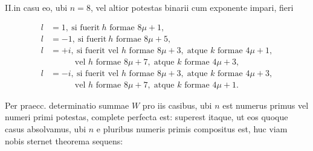 
II.\quad in casu eo, ubi $n=8$, vel altior potestas binarii cum exponente impari, fieri

\[
\begin{aligned}
l&=1,\ \text{si fuerit}\  h\text{ formae }8\mu+1,\\
l&=-1,\ \text{si fuerit}\  h\text{ formae }8\mu+5,\\
l&=+i,\ \text{si fuerit vel }h\text{ formae }8\mu+3,\;\text{atque }k\text{ formae }4\mu+1,\\
&\phantom{=+i,}\text{vel }h\text{ formae }8\mu+7,\;\text{atque }k\text{ formae }4\mu+3,\\
l&=-i,\ \text{si fuerit vel }h\text{ formae }8\mu+3,\;\text{atque }k\text{ formae }4\mu+3,\\
&\phantom{=+i,}\text{vel }h\text{ formae }8\mu+7,\;\text{atque }k\text{ formae }4\mu+1.
\end{aligned}
\]

Per praecc. determinatio summae $W$ pro iis casibus, ubi $n$ est numerus primus vel numeri primi potestas, complete perfecta est: superest itaque, ut eos quoque casus absolvamus, ubi $n$ e pluribus numeris primis compositus est, huc viam nobis sternet theorema sequens:
